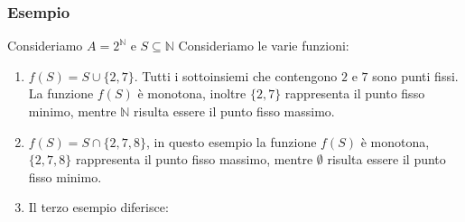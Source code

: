 \subsubsection{Esempio}
Consideriamo $A=2^\mathbb{N}$ e $S \subseteq \mathbb{N}$
Consideriamo le varie funzioni:
\begin{enumerate}
    \item $f(S) = S \cup \{2,7\}$. Tutti i sottoinsiemi che contengono $2$ e $7$ sono punti fissi. La funzione $f(S)$ è monotona, inoltre $\{2,7\}$ rappresenta il punto fisso minimo, mentre $\mathbb{N}$ risulta essere il punto fisso massimo.
    \item $f(S) = S \cap \{2,7,8\}$, in questo esempio la funzione $f(S)$ è monotona, $\{2,7,8\}$ rappresenta il punto fisso massimo, mentre $\emptyset$ risulta essere il punto fisso minimo.
    \item Il terzo esempio diferisce:
    
    {\centering
        }
\end{enumerate}
